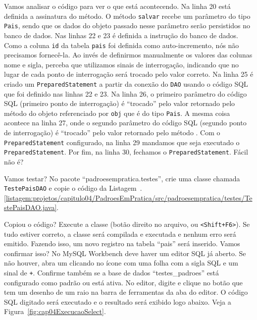 Vamos analisar o código para ver o que está acontecendo. Na linha 20 está definida a assinatura do método. O método \texttt{salvar} recebe um parâmetro do tipo \texttt{Pais}, sendo que os dados do objeto passado nesse parâmetro serão persistidos no banco de dados. Nas linhas 22 e 23 é definida a instrução  do banco de dados. Como a coluna \texttt{id} da tabela \texttt{pais} foi definida como auto-incremento, nós não precisamos fornecê-la. Ao invés de definirmos manualmente os valores das colunas nome e sigla, perceba que utilizamos sinais de interrogação, indicando que no lugar de cada ponto de interrogação será trocado pelo valor correto. Na linha 25 é criado um \texttt{PreparedStatement} a partir da conexão do \texttt{DAO} usando o código SQL que foi definido nas linhas 22 e 23. Na linha 26, o primeiro parâmetro do código SQL (primeiro ponto de interrogação) é ``trocado'' pelo valor retornado pelo método  do objeto referenciado por \texttt{obj} que é do tipo \texttt{Pais}. A mesma coisa acontece na linha 27, onde o segundo parâmetro do código SQL (segundo ponto de interrogação) é ``trocado'' pelo valor retornado pelo método . Com o \texttt{PreparedStatement} configurado, na linha 29 mandamos que seja executado o \texttt{PreparedStatement}. Por fim, na linha 30, fechamos o \texttt{PreparedStatement}. Fácil não é?

Vamos testar? No pacote ``padroesempratica.testes'', crie uma classe chamada \texttt{TestePaisDAO} e copie o código da Listagem~\thechapter.\ref{listagem:projetos/capitulo04/PadroesEmPratica/src/padroesempratica/testes/TestePaisDAO.java}.


Copiou o código? Execute a classe (botão direito no arquivo,  ou \texttt{<Shift+F6>}). Se tudo estiver correto, a classe será compilada e executada e nenhum erro será emitido. Fazendo isso, um novo registro na tabela ``pais'' será inserido. Vamos confirmar isso? No MySQL Workbench deve haver um editor SQL já aberto. Se não houver, abra um clicando no ícone com uma folha com a sigla SQL e um sinal de \texttt{+}. Confirme também se a base de dados ``testes\_padroes'' está configurado como padrão ou está ativa. No editor, digite  e clique no botão que tem um desenho de um raio na barra de ferramentas da aba do editor. O código SQL digitado será executado e o resultado será exibido logo abaixo. Veja a Figura~\ref{fig:cap04ExecucaoSelect}.

